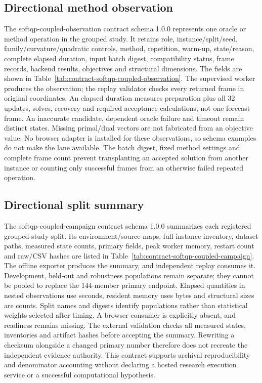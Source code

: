 \subsection{Directional method observation}\label{sec:contract-softqp-coupled-observation}
The softqp-coupled-observation contract schema 1.0.0 represents one oracle or
method operation in the grouped study. It retains role, instance/split/seed,
family/curvature/quadratic controls, method, repetition, warm-up, state/reason,
complete elapsed duration, input batch digest, compatibility status, frame
records, backend results, objectives and structural dimensions. The fields
are shown in Table~\ref{tab:contract-softqp-coupled-observation}. The supervised
worker produces the observation; the replay validator checks every returned
frame in original coordinates. An elapsed duration measures preparation
plus all 32 updates, solves, recovery and required acceptance calculations,
not one forecast frame. An inaccurate candidate, dependent oracle failure
and timeout remain distinct states. Missing primal/dual vectors are not
fabricated from an objective value. No browser adapter is installed for
these observations, so schema examples do not make the lane available.
The batch digest, fixed method settings and complete frame count prevent
transplanting an accepted solution from another instance or counting only
successful frames from an otherwise failed repeated operation.


\subsection{Directional split summary}\label{sec:contract-softqp-coupled-campaign} %
The softqp-coupled-campaign contract schema 1.0.0 summarizes each registered %
grouped-study split. Its environment/source maps, full instance inventory,
dataset paths, measured state counts, primary fields, peak worker memory,
restart count and raw/CSV hashes are listed in
Table~\ref{tab:contract-softqp-coupled-campaign}. The offline exporter produces %
the summary, and independent replay consumes it. Development, held-out and
robustness populations remain separate; they cannot be pooled to replace
the 144-member primary endpoint. Elapsed quantities in nested observations
use seconds, resident memory uses bytes and structural sizes are counts.
Split names and digests identify populations rather than statistical
weights selected after timing. A browser consumer is explicitly absent,
and readiness remains missing. The external validation checks all measured
states, inventories and artifact hashes before accepting the summary.
Rewriting a checksum alongside a changed primary number therefore does
not recreate the independent evidence authority. This contract supports
archival reproducibility and denominator accounting without declaring a
hosted research execution service or a successful computational hypothesis.

